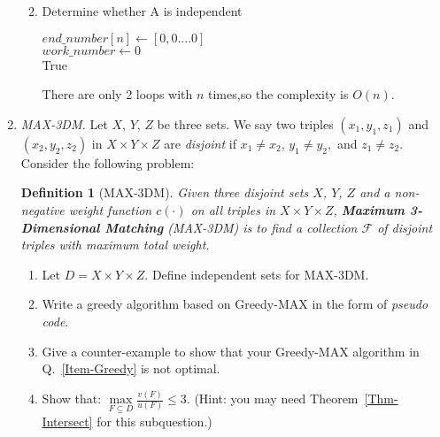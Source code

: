\documentclass[12pt,a4paper]{article}
\makeatletter
\newtheorem*{solution}{Solution}
\newtheorem{definition}{Definition}
\theoremstyle{definition}
\renewenvironment{solution}[1][Solution] {\par\pushQED{\qed}\normalfont\topsep6\p@\@plus6\p@\relax\trivlist\item[\hskip\labelsep\bfseries#1\@addpunct{.}]\ignorespaces}{\popQED\endtrivlist\@endpefalse} \makeatother
\makeatother
\begin{document}
\begin{enumerate}
\begin{enumerate}
\begin{solution}
\begin{algorithm}[H]
        \BlankLine
        \caption{Determine whether A is independent}
        \label{algorithm1}
        $end\_number[n]\leftarrow [0,0....0]$\\
        $work\_number\leftarrow 0$\\
        \Return True
        \end{algorithm}
        There are only 2 loops with $n$ times,so the complexity is $O(n)$.
            \end{solution}
    \end{enumerate}

\item \textit{MAX-3DM.} Let $X$, $Y$, $Z$ be three sets. We say two triples $\left(x_{1}, y_{1}, z_{1}\right)$ and $\left(x_{2}, y_{2}, z_{2}\right)$ in $X \times Y \times Z$ are \textit{disjoint} if $x_{1} \neq x_{2}$, $y_{1} \neq y_{2},$ and $z_{1} \neq z_{2}$. Consider the following problem:
    
    \begin{definition}[MAX-3DM] 
        Given three disjoint sets $X$, $Y$, $Z$ and a non-negative weight function $c(\cdot)$ on all triples in $X \times Y \times Z$, \textbf{Maximum 3-Dimensional Matching} (MAX-3DM) is to find a collection $\mathcal{F}$ of disjoint triples with maximum total weight.
    \end{definition}

    \begin{enumerate}
    	\item Let $D = X \times Y \times Z$. Define independent sets for MAX-3DM.
    	\item Write a greedy algorithm based on Greedy-MAX in the form of \emph{pseudo code}. \label{Item-Greedy}
    	\item Give a counter-example to show that your Greedy-MAX algorithm in Q.~\ref{Item-Greedy} is not optimal.
    	\item Show that: $\max\limits_{F \subseteq D} \frac{v(F)}{u(F)} \leq 3$. {\color{blue}(Hint: you may need Theorem~\ref{Thm-Intersect} for this subquestion.)} 


\end{enumerate}
\end{enumerate}
\end{document}
